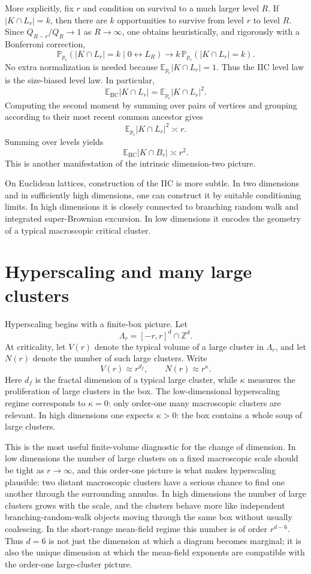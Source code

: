 \documentclass[11pt,reqno]{book}
\numberwithin{equation}{chapter}
\theoremstyle{plain}
\theoremstyle{definition}
\theoremstyle{remark}
\renewcommand{\P}{\mathbb P}
\newcommand{\E}{\mathbb E}
\newcommand{\Z}{\mathbb Z}
\newcommand{\1}{\mathbf 1}
\newcommand{\as}{\asymp}
\begin{document}
More explicitly, fix $r$ and condition on survival to a much larger level $R$. If $|K\cap L_r|=k$, then there are $k$ opportunities to survive from level $r$ to level $R$. Since $Q_{R-r}/Q_R\to 1$ as $R\to\infty$, one obtains heuristically, and rigorously with a Bonferroni correction,
\[
  \P_{p_c}(|K\cap L_r|=k\mid 0\leftrightarrow L_R)
  \longrightarrow
  k\,\P_{p_c}(|K\cap L_r|=k).
\]
No extra normalization is needed because $\E_{p_c}|K\cap L_r|=1$. Thus the IIC level law is the size-biased level law. In particular,
\[
  \E_{\mathrm{IIC}}|K\cap L_r|
  =
  \E_{p_c}|K\cap L_r|^2.
\]
Computing the second moment by summing over pairs of vertices and grouping according to their most recent common ancestor gives
\[
  \E_{p_c}|K\cap L_r|^2\as r.
\]
Summing over levels yields
\[
  \E_{\mathrm{IIC}}|K\cap B_r|\as r^2.
\]
This is another manifestation of the intrinsic dimension-two picture.

On Euclidean lattices, construction of the IIC is more subtle. In two dimensions and in sufficiently high dimensions, one can construct it by suitable conditioning limits. In high dimensions it is closely connected to branching random walk and integrated super-Brownian excursion. In low dimensions it encodes the geometry of a typical macroscopic critical cluster.

\section{Hyperscaling and many large clusters}

Hyperscaling begins with a finite-box picture. Let
\[
  \Lambda_r=[-r,r]^d\cap\Z^d.
\]
At criticality, let $V(r)$ denote the typical volume of a large cluster in $\Lambda_r$, and let $N(r)$ denote the number of such large clusters. Write
\[
  V(r)\approx r^{d_f},
  \qquad
  N(r)\approx r^\kappa.
\]
Here $d_f$ is the fractal dimension of a typical large cluster, while $\kappa$ measures the proliferation of large clusters in the box. The low-dimensional hyperscaling regime corresponds to $\kappa=0$: only order-one many macroscopic clusters are relevant. In high dimensions one expects $\kappa>0$: the box contains a whole soup of large clusters.

This is the most useful finite-volume diagnostic for the change of dimension. In low dimensions the number of large clusters on a fixed macroscopic scale should be tight as $r\to\infty$, and this order-one picture is what makes hyperscaling plausible: two distant macroscopic clusters have a serious chance to find one another through the surrounding annulus. In high dimensions the number of large clusters grows with the scale, and the clusters behave more like independent branching-random-walk objects moving through the same box without usually coalescing. In the short-range mean-field regime this number is of order $r^{d-6}$. Thus $d=6$ is not just the dimension at which a diagram becomes marginal; it is also the unique dimension at which the mean-field exponents are compatible with the order-one large-cluster picture.
\end{document}
